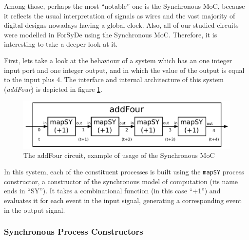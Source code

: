 \documentclass[a4paper]{article}
\begin{document}
                Among those, perhaps the most ``notable'' one is the Synchronous MoC, because it
                reflects the usual interpretation of signals as wires and the vast majority of
                digital designs nowadays having a global clock. Also, all of our studied circuits
                were modelled in ForSyDe using the Synchronous MoC. Therefore, it is interesting to
                take a deeper look at it.

                First, lets take a look at the behaviour of a system which has an one integer input
                port and one integer output, and in which the value of the output is equal to the
                input plus 4. The interface and internal architecture of this system
                (\emph{addFour}) is depicted in figure \ref{fig:forsyde-addFour}.
                \begin{figure}[h]
                    \begin{center}
                        \includegraphics[width=1.0\textwidth]{imgs/forsyde-addFour.pdf}
                    \end{center}
                    \label{fig:forsyde-addFour}
                    \caption{The addFour circuit, example of usage of the Synchronous MoC}
                \end{figure}

                In this system, each of the constituent processes is built using the \texttt{mapSY}
                process constructor, a constructor of the synchronous model of computation (its name
                ends in ``SY''). It takes a combinational function (in this case ``+1'') and
                evaluates it for each event in the input signal, generating a corresponding event in
                the output signal.

            \subsubsection{Synchronous Process Constructors}
            \label{subsubsec:forsyde-synchprocs}

\end{document}
